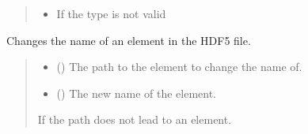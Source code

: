 \documentclass[letterpaper,10pt,english]{sphinxmanual}
\begin{document}
\begin{fulllineitems}
\begin{fulllineitems}
\begin{quote}
\begin{description}
\begin{itemize}
\item {} 
\sphinxAtStartPar
{\hyperref[\detokenize{source/_autosummary/HDF5_BLS.errors:HDF5_BLS.errors.WrapperError_ArgumentType}]{}} \textendash{} If the type is not valid

\end{itemize}

\end{description}\end{quote}

\end{fulllineitems}


\begin{fulllineitems}
\label{\detokenize{source/_autosummary/HDF5_BLS.Wrapper:HDF5_BLS.Wrapper.change_name}}
\pysigstartsignatures
\pysiglinewithargsret
{}
{\sphinxparamcomma {}}
{}
\pysigstopsignatures
\sphinxAtStartPar
Changes the name of an element in the HDF5 file.
\begin{quote}\begin{description}
\begin{itemize}
\item {} 
\sphinxAtStartPar
{} () \textendash{} The path to the element to change the name of.

\item {} 
\sphinxAtStartPar
{} () \textendash{} The new name of the element.

\end{itemize}

\sphinxAtStartPar
{\hyperref[\detokenize{source/_autosummary/HDF5_BLS.errors:HDF5_BLS.errors.WrapperError_StructureError}]{}} \textendash{} If the path does not lead to an element.

\end{description}\end{quote}

\end{fulllineitems}


\end{fulllineitems}
\end{document}
